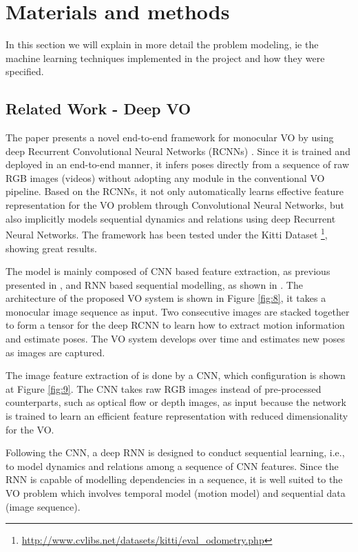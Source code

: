 \section{Materials and methods} \label{sec:metodos}
    In this section we will explain in more detail the problem modeling, ie the machine learning techniques implemented in the project and how they were specified.
    
    \subsection{Related Work - Deep VO}
        The paper \cite{wang2017deepvo} presents a novel end-to-end framework for monocular VO by using deep Recurrent Convolutional Neural Networks (RCNNs) \cite{liang2015recurrent}. Since it is trained and deployed in an end-to-end manner, it infers poses directly from a sequence of raw RGB images (videos) without adopting any module in the conventional VO pipeline. Based on the RCNNs, it not only automatically learns effective feature representation for the VO problem through Convolutional Neural Networks, but also implicitly models sequential dynamics and relations using deep Recurrent Neural Networks. The framework has been tested under the Kitti Dataset \footnote{\url{http://www.cvlibs.net/datasets/kitti/eval_odometry.php}}, showing great results.
        
        The model is mainly composed of CNN based feature extraction, as previous presented in \cite{chen2016deep}, and RNN based sequential modelling, as shown in \cite{chung2015recurrent}. The architecture of the proposed VO system is shown in Figure \ref{fig:8}, it takes a monocular image sequence as input. Two consecutive images are stacked together to form a tensor for the deep RCNN to learn how to extract motion information and estimate poses. The VO system develops over time and estimates new poses as images are captured. 
        
        The image feature extraction of is done by a CNN, which configuration is shown at Figure \ref{fig:9}. The CNN takes raw RGB images instead of pre-processed counterparts, such as optical flow or depth images, as input because the network is trained to learn an efficient feature representation with reduced dimensionality for the VO.
        
        Following the CNN, a deep RNN is designed to conduct sequential learning, i.e., to model dynamics and relations among a sequence of CNN features. Since the RNN is capable of modelling dependencies in a sequence, it is well suited to the VO problem which involves temporal model (motion model) and sequential data (image sequence). 
        
